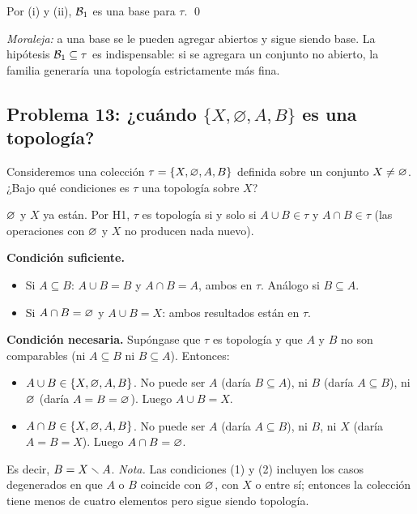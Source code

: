 Por (i) y (ii), $\mathcal{B}_1$ es una base para $\tau$. \qed

\emph{Moraleja:} a una base se le pueden agregar abiertos y sigue siendo base. La hipótesis $\mathcal{B}_1\subseteq\tau$ es
indispensable: si se agregara un conjunto no abierto, la familia generaría una topología estrictamente más fina.

\subsection{Problema 13: ¿cuándo \texorpdfstring{$\{X,\varnothing,A,B\}$}{\{X,vacío,A,B\}} es una topología?}
\begin{enunciado}
Consideremos una colección $\tau=\{X,\varnothing,A,B\}$ definida sobre un conjunto $X\neq\varnothing$. ¿Bajo qué condiciones es
$\tau$ una topología sobre $X$?
\end{enunciado}
$\varnothing$ y $X$ ya están. Por H1, $\tau$ es topología si y solo si $A\cup B\in\tau$ y $A\cap B\in\tau$ (las operaciones
con $\varnothing$ y $X$ no producen nada nuevo).

\textbf{Condición suficiente.}
\begin{itemize}
\item Si $A\subseteq B$: $A\cup B=B$ y $A\cap B=A$, ambos en $\tau$. Análogo si $B\subseteq A$.
\item Si $A\cap B=\varnothing$ y $A\cup B=X$: ambos resultados están en $\tau$.
\end{itemize}
\textbf{Condición necesaria.} Supóngase que $\tau$ es topología y que $A$ y $B$ no son comparables (ni $A\subseteq B$
ni $B\subseteq A$). Entonces:
\begin{itemize}
\item $A\cup B\in\{X,\varnothing,A,B\}$. No puede ser $A$ (daría $B\subseteq A$), ni $B$ (daría $A\subseteq B$), ni $\varnothing$
(daría $A=B=\varnothing$). Luego $A\cup B=X$.
\item $A\cap B\in\{X,\varnothing,A,B\}$. No puede ser $A$ (daría $A\subseteq B$), ni $B$, ni $X$ (daría $A=B=X$). Luego
$A\cap B=\varnothing$.
\end{itemize}
Es decir, $B=X\smallsetminus A$.
\emph{Nota.} Las condiciones (1) y (2) incluyen los casos degenerados en que $A$ o $B$ coincide con $\varnothing$, con $X$ o
entre sí; entonces la colección tiene menos de cuatro elementos pero sigue siendo topología.
